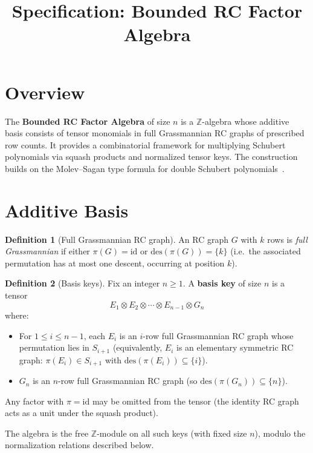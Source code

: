 \documentclass[11pt]{article}
\title{Specification: Bounded RC Factor Algebra}
\author{}
\date{}
\newcommand{\Z}{\mathbb{Z}}
\newcommand{\Sym}{S}
\newcommand{\id}{\mathrm{id}}
\newcommand{\des}{\mathrm{des}}
\newcommand{\tens}{\otimes}
\theoremstyle{definition}
\newtheorem{definition}{Definition}
\begin{document}
\maketitle

\section{Overview}

The \textbf{Bounded RC Factor Algebra} of size $n$ is a $\Z$-algebra whose additive basis consists of tensor monomials in full Grassmannian RC graphs of prescribed row counts.  It provides a combinatorial framework for multiplying Schubert polynomials via squash products and normalized tensor keys.  The construction builds on the Molev--Sagan type formula for double Schubert polynomials~\cite{samuelmolev}.

\section{Additive Basis}

\begin{definition}[Full Grassmannian RC graph]
An RC graph $G$ with $k$ rows is \emph{full Grassmannian} if either $\pi(G) = \id$ or $\des(\pi(G)) = \{k\}$ (i.e.\ the associated permutation has at most one descent, occurring at position $k$).
\end{definition}

\begin{definition}[Basis keys]
Fix an integer $n \geq 1$.  A \textbf{basis key} of size $n$ is a tensor
\[
  E_1 \tens E_2 \tens \cdots \tens E_{n-1} \tens G_n
\]
where:
\begin{itemize}
  \item For $1 \leq i \leq n-1$, each $E_i$ is an $i$-row full Grassmannian RC graph whose permutation lies in $\Sym_{i+1}$ (equivalently, $E_i$ is an elementary symmetric RC graph: $\pi(E_i) \in \Sym_{i+1}$ with $\des(\pi(E_i)) \subseteq \{i\}$).
  \item $G_n$ is an $n$-row full Grassmannian RC graph (so $\des(\pi(G_n)) \subseteq \{n\}$).
\end{itemize}
Any factor with $\pi = \id$ may be omitted from the tensor (the identity RC graph acts as a unit under the squash product).

The algebra is the free $\Z$-module on all such keys (with fixed size $n$), modulo the normalization relations described below.
\end{definition}
\end{document}
